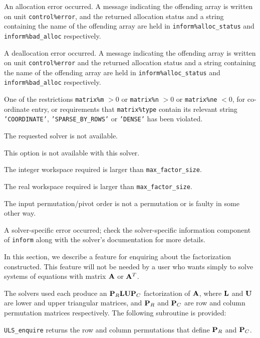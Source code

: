 \documentclass{galahad}
\newcommand{\packagename}{ULS}
\begin{document}
\begin{description}

\itt{\galerrallocate} An allocation error occurred. A message indicating
the offending
array is written on unit {\tt control\%error}, and the returned allocation
status and a string containing the name of the offending array
are held in {\tt inform\%alloc\_\-status}
and {\tt inform\%bad\_alloc} respectively.

\itt{\galerrdeallocate} A deallocation error occurred.
A message indicating the offending
array is written on unit {\tt control\%error} and the returned allocation
status and a string containing the name of the offending array
are held in {\tt inform\%alloc\_\-status}
and {\tt inform\%bad\_alloc} respectively.

\itt{\galerrrestrictions} One of the restrictions
 {\tt matrix\%m} $> 0$ or
 {\tt matrix\%n} $> 0$ or
 {\tt matrix\%ne} $< 0$, for co-ordinate entry,
  or requirements that {\tt matrix\%type}
  contain its relevant string
{\tt 'COORDINATE'}, {\tt 'SPARSE\_BY\_ROWS'} or   {\tt 'DENSE'}
  has been violated.

\itt{\galunknownsolver} The requested solver is not available.

\itt{\galerrunavailable} This option is not available with this solver.

 The integer workspace required is larger than
 {\tt max\_factor\_size}.

 The real workspace  required is larger than
 {\tt max\_factor\_size}.


  The input permutation/pivot order is not a permutation or is
    faulty in some other way.

 A solver-specific error occurred; check the solver-specific
  information component of {\tt inform} along with the solver's documentation
  for more details.

\end{description}


\galfeatures
\noindent In this section, we describe a feature for enquiring about
the factorization constructed. This feature
will not be needed by a user who wants simply to solve systems of
equations with matrix ${\mathbf{A}}$ or ${\mathbf{A}}^T$.

The solvers used each produce an ${\mathbf{P}}_R {\mathbf{L}} {\mathbf{U}} {\mathbf{P}}_C$ factorization
of ${\mathbf{A}}$, where ${\mathbf{L}}$ and ${\mathbf{U}}$ are lower and upper triangular
matrices, and ${\mathbf{P}}_R$ and ${\mathbf{P}}_C$ are row and column permutation
matrices respectively.
The following subroutine is provided:
\begin{description}
\ittf{} {\tt \packagename\_enquire} returns the row and column permutations
that define ${\mathbf{P}}_R$ and ${\mathbf{P}}_C$.


\end{description}
\end{document}
